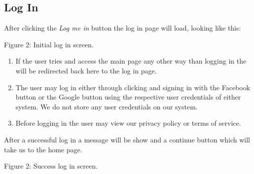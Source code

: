 \documentclass[hidelinks,english]{article}
\begin{document}
	\subsection{Log In}
    	    After clicking the \textit{Log me in} button the log in page will load, looking like this:
            \begin{center}
        	  \caption{Figure 2: Initial log in screen.}
        	  \label{Log In}
        	\end{center}
    	\begin{enumerate}  
            \item If the user tries and access the main page any other way than logging in the will be redirected back here to the log in page. 
            \item The user may log in either through clicking and signing in with the Facebook button or the Google button using the respective user credentials of either system. We do not store any user credentials on our system.
            \item Before logging in the user may view our privacy policy or terms of service. 
        \end{enumerate}
        
        After a successful log in a  message will be show and a continue button which will take us to the home page.
        \begin{center}
    	  \caption{Figure 2: Success log in screen.}
    	  \label{Log In Success}
    	\end{center}
    	
\end{document}
